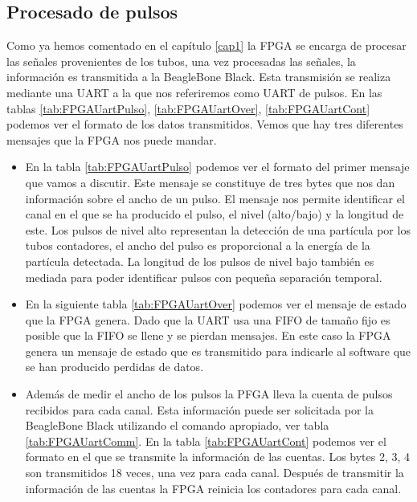 	\subsection{Procesado de pulsos}
		Como ya hemos comentado en el capítulo \ref{cap1} la FPGA se encarga de procesar las señales provenientes de los tubos, una vez procesadas
		las señales, la información es transmitida a la BeagleBone Black. Esta transmisión se realiza mediante una UART a la que nos referiremos
		como UART de pulsos. En las tablas \ref{tab:FPGAUartPulso}, \ref{tab:FPGAUartOver}, \ref{tab:FPGAUartCont} podemos ver el formato de los
		datos transmitidos. Vemos que hay tres diferentes mensajes que la FPGA nos puede mandar.
		\begin{itemize}
			\item	En la tabla \ref{tab:FPGAUartPulso} podemos ver el formato del primer mensaje que vamos a discutir. Este mensaje se
			  	constituye de tres bytes que nos dan información sobre el ancho de un pulso. El mensaje nos permite identificar el canal
				en el que se ha producido el pulso, el nivel (alto/bajo) y la longitud de este. Los pulsos de nivel alto representan la
				detección de una partícula por los tubos contadores, el ancho del pulso es proporcional a la energía de la partícula
				detectada. La longitud de los pulsos de nivel bajo también es mediada para poder identificar pulsos con pequeña
				separación temporal.
			\item 	En la siguiente tabla \ref{tab:FPGAUartOver} podemos ver el mensaje de estado que la FPGA genera. Dado que la UART usa
			  	una FIFO de tamaño fijo es posible que la FIFO se llene y se pierdan mensajes. En este caso la FPGA genera un mensaje de
				estado que es transmitido para indicarle al software que se han producido perdidas de datos.
			\item	Además de medir el ancho de los pulsos la PFGA lleva la cuenta de pulsos recibidos para cada canal. Esta información
			  	puede ser solicitada por la BeagleBone Black utilizando el comando apropiado, ver tabla \ref{tab:FPGAUartComm}. En la
				tabla \ref{tab:FPGAUartCont} podemos ver el formato en el que se transmite la información de las cuentas. Los bytes
				2, 3, 4 son transmitidos 18 veces, una vez para cada canal. Después de transmitir la información de las cuentas la FPGA
				reinicia los contadores para cada canal.
		\end{itemize}

